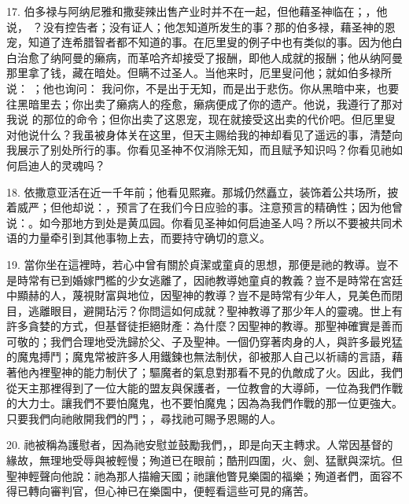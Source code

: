 17. 伯多禄与阿纳尼雅和撒斐辣出售产业时并不在一起，但他藉圣神临在；，他说， ？没有控告者；没有证人；他怎知道所发生的事？那的伯多禄，藉圣神的恩宠，知道了连希腊智者都不知道的事。在厄里叟的例子中也有类似的事。因为他白白治愈了纳阿曼的癞病，而革哈齐却接受了报酬，即他人成就的报酬；他从纳阿曼那里拿了钱，藏在暗处。但瞒不过圣人。当他来时，厄里叟问他；就如伯多禄所说： ；他也询问：  我问你，不是出于无知，而是出于悲伤。你从黑暗中来，也要往黑暗里去；你出卖了癞病人的痊愈，癞病便成了你的遗产。他说，我遵行了那对我说  的那位的命令；但你出卖了这恩宠，现在就接受这出卖的代价吧。但厄里叟对他说什么？我虽被身体关在这里，但天主赐给我的神却看见了遥远的事，清楚向我展示了别处所行的事。你看见圣神不仅消除无知，而且赋予知识吗？你看见祂如何启迪人的灵魂吗？\par

18. 依撒意亚活在近一千年前；他看见熙雍。那城仍然矗立，装饰着公共场所，披着威严；但他却说：，预言了在我们今日应验的事。注意预言的精确性；因为他曾说：。如今那地方到处是黄瓜园。你看见圣神如何启迪圣人吗？所以不要被共同术语的力量牵引到其他事物上去，而要持守确切的意义。\par

19. 當你坐在這裡時，若心中曾有關於貞潔或童貞的思想，那便是祂的教導。豈不是時常有已到婚嫁門檻的少女逃離了，因祂教導她童貞的教義？豈不是時常在宮廷中顯赫的人，蔑視財富與地位，因聖神的教導？豈不是時常有少年人，見美色而閉目，逃離眼目，避開玷污？你問這如何成就？聖神教導了那少年人的靈魂。世上有許多貪婪的方式，但基督徒拒絕財產：為什麼？因聖神的教導。那聖神確實是善而可敬的；我們合理地受洗歸於父、子及聖神。一個仍穿著肉身的人，與許多最兇猛的魔鬼搏鬥；魔鬼常被許多人用鐵鍊也無法制伏，卻被那人自己以祈禱的言語，藉著他內裡聖神的能力制伏了；驅魔者的氣息對那看不見的仇敵成了火。因此，我們從天主那裡得到了一位大能的盟友與保護者，一位教會的大導師，一位為我們作戰的大力士。讓我們不要怕魔鬼，也不要怕魔鬼；因為為我們作戰的那一位更強大。只要我們向祂敞開我們的門；，尋找祂可賜予恩賜的人。\par

20. 祂被稱為護慰者，因為祂安慰並鼓勵我們，，即是向天主轉求。人常因基督的緣故，無理地受辱與被輕慢；殉道已在眼前；酷刑四圍，火、劍、猛獸與深坑。但聖神輕聲向他說：祂為那人描繪天國；祂讓他瞥見樂園的福樂；殉道者們，面容不得已轉向審判官，但心神已在樂園中，便輕看這些可見的痛苦。\par

